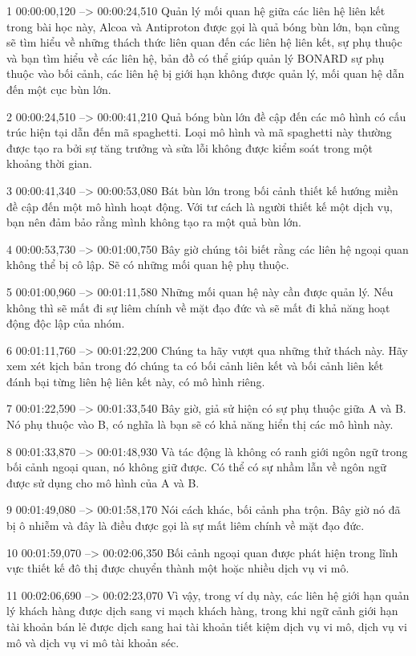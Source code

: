 1
00:00:00,120 --> 00:00:24,510
Quản lý mối quan hệ giữa các liên hệ liên kết trong bài học này, Alcoa và Antiproton được gọi là quả bóng bùn lớn, bạn cũng sẽ tìm hiểu về những thách thức liên quan đến các liên hệ liên kết, sự phụ thuộc và bạn tìm hiểu về các liên hệ, bản đồ có thể giúp quản lý BONARD  sự phụ thuộc vào bối cảnh, các liên hệ bị giới hạn không được quản lý, mối quan hệ dẫn đến một cục bùn lớn.

2
00:00:24,510 --> 00:00:41,210
Quả bóng bùn lớn đề cập đến các mô hình có cấu trúc hiện tại dẫn đến mã spaghetti.  Loại mô hình và mã spaghetti này thường được tạo ra bởi sự tăng trưởng và sửa lỗi không được kiểm soát trong một khoảng thời gian.

3
00:00:41,340 --> 00:00:53,080
Bát bùn lớn trong bối cảnh thiết kế hướng miền đề cập đến một mô hình hoạt động.  Với tư cách là người thiết kế một dịch vụ, bạn nên đảm bảo rằng mình không tạo ra một quả bùn lớn.

4
00:00:53,730 --> 00:01:00,750
Bây giờ chúng tôi biết rằng các liên hệ ngoại quan không thể bị cô lập.  Sẽ có những mối quan hệ phụ thuộc.

5
00:01:00,960 --> 00:01:11,580
Những mối quan hệ này cần được quản lý.  Nếu không thì sẽ mất đi sự liêm chính về mặt đạo đức và sẽ mất đi khả năng hoạt động độc lập của nhóm.

6
00:01:11,760 --> 00:01:22,200
Chúng ta hãy vượt qua những thử thách này.  Hãy xem xét kịch bản trong đó chúng ta có bối cảnh liên kết và bối cảnh liên kết đánh bại từng liên hệ liên kết này, có mô hình riêng.

7
00:01:22,590 --> 00:01:33,540
Bây giờ, giả sử hiện có sự phụ thuộc giữa A và B.  Nó phụ thuộc vào B, có nghĩa là bạn sẽ có khả năng hiển thị các mô hình này.

8
00:01:33,870 --> 00:01:48,930
Và tác động là không có ranh giới ngôn ngữ trong bối cảnh ngoại quan, nó không giữ được.  Có thể có sự nhầm lẫn về ngôn ngữ được sử dụng cho mô hình của A và B.

9
00:01:49,080 --> 00:01:58,170
Nói cách khác, bối cảnh pha trộn.  Bây giờ nó đã bị ô nhiễm và đây là điều được gọi là sự mất liêm chính về mặt đạo đức.

10
00:01:59,070 --> 00:02:06,350
Bối cảnh ngoại quan được phát hiện trong lĩnh vực thiết kế đô thị được chuyển thành một hoặc nhiều dịch vụ vi mô.

11
00:02:06,690 --> 00:02:23,070
Vì vậy, trong ví dụ này, các liên hệ giới hạn quản lý khách hàng được dịch sang vi mạch khách hàng, trong khi ngữ cảnh giới hạn tài khoản bán lẻ được dịch sang hai tài khoản tiết kiệm dịch vụ vi mô, dịch vụ vi mô và dịch vụ vi mô tài khoản séc.

